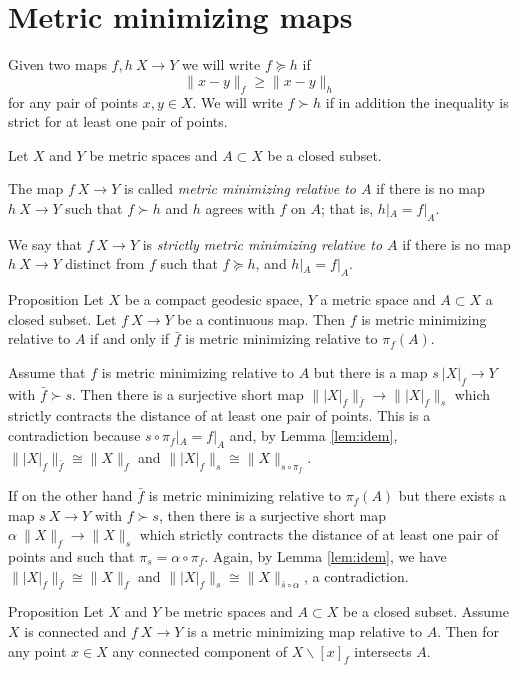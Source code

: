 \documentclass{article}
\begin{document}
\section{Metric minimizing maps}
Given two maps $f,h\:X\to Y$ we will write $f\succcurlyeq h$ if 
\[\|x-y\|_f\ge \|x-y\|_h\]
for any pair of points $x,y\in X$.
We will write $f\succ h$ 
if in addition the inequality is strict for at least one pair of points.


Let $X$ and $Y$ be metric spaces and $A\subset X$ be a closed subset.

The map $f\:X\to Y$ is called \emph{metric minimizing relative to $A$}
if there is no map $h\:X\to Y$ such that $f\succ h$
and $h$ agrees with $f$ on $A$;
that is, $h|_A=f|_A$.

We say that $f\:X\to Y$ is \emph{strictly metric minimizing relative to $A$}
if there is no map $h\:X\to Y$ distinct from $f$
such that $f\succcurlyeq h$, 
and $h|_A=f|_A$.

\begin{thm}{Proposition}\label{prop:memicrit}
Let $X$ be a compact geodesic space, $Y$ a metric space 
and $A\subset X$ a closed subset.
Let $f\:X\to Y$ be a continuous map. Then $f$ is metric minimizing relative to $A$
if and only if $\bar f$ is metric minimizing relative to $\pi_f(A)$.
\end{thm}

Assume that $f$ is metric minimizing relative to $A$ but there is a map $s\:|X|_f\to Y$ with $\bar f\succ s$. 
Then there is a surjective short map $\||X|_f\|_{\bar f}\to\||X|_f\|_s$ which strictly
contracts the distance of at least one pair of points. This is a contradiction because $s\circ\pi_f|_A=f|_A$ and, by Lemma \ref{lem:idem}, 
$\||X|_f\|_{\bar f}\cong\|X\|_f$ and $\||X|_f\|_s\cong\|X\|_{s\circ\pi_f}$. 

If on the other hand $\bar f$ is metric minimizing relative to $\pi_f(A)$ but there exists a map $s\:X\to Y$ with $f\succ s$,
then there is a surjective short map $\alpha\:\|X\|_f\to\|X\|_s$ which strictly
contracts the distance of at least one pair of points and such that $\pi_s=\alpha\circ\pi_f$. 
Again, by Lemma \ref{lem:idem}, we have  $\||X|_f\|_{\bar f}\cong\|X\|_f$ and $\||X|_f\|_s\cong\|X\|_{\bar s\circ\alpha}$, a contradiction. 
\qeds

\begin{thm}{Proposition}\label{prop:point-complement}
Let $X$ and $Y$ be metric spaces and $A\subset X$ be a closed subset.
Assume $X$ is connected and $f\:X\to Y$ is a metric minimizing map relative to $A$.
Then for any point $x\in X$ any connected component of $X\backslash [x]_f$ intersects $A$.

\end{thm}
\end{document}
